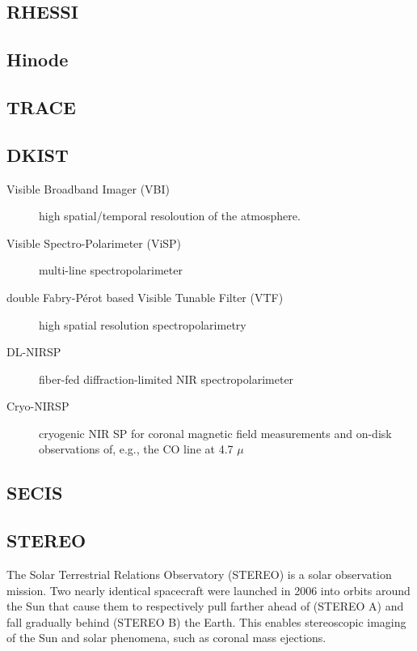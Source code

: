 \documentclass{article}
\begin{document}
\subsection{RHESSI}
\subsection{Hinode}
\subsection{TRACE}
\subsection{DKIST}
\begin{description}
    \item [Visible Broadband Imager (VBI)] high spatial/temporal resoloution
        of the atmosphere.
    \item [Visible Spectro-Polarimeter (ViSP)] multi-line spectropolarimeter
    \item [double Fabry-P\'erot based Visible Tunable Filter (VTF)] high spatial
        resolution spectropolarimetry
    \item [DL-NIRSP] fiber-fed diffraction-limited NIR spectropolarimeter
    \item [Cryo-NIRSP] cryogenic NIR SP for coronal magnetic field measurements
        and on-disk observations of, e.g., the CO line at 4.7 ${\mu}$
\end{description}
\subsection{SECIS}
\subsection{STEREO}
The Solar Terrestrial Relations Observatory (STEREO) is a solar observation
mission. Two nearly identical spacecraft were launched in 2006 into
orbits around the Sun that cause them to respectively pull farther ahead
of (STEREO A)
and fall gradually behind (STEREO B) the Earth. This enables stereoscopic
imaging of the Sun and solar phenomena, such as coronal mass ejections.
\end{document}
